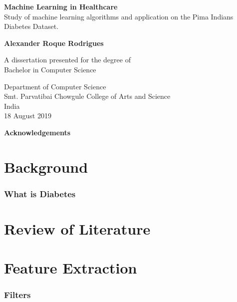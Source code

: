 \documentclass[12pt]{article}
\begin{document}
\begin{titlepage}
    \begin{center}
        \vspace*{1cm} 
        \Huge
        \textbf{Machine Learning in Healthcare} 
        \vspace{0.5cm}
        \normalsize
        \vspace{0cm}
        \\
        Study of machine learning algorithms and application on the Pima Indians Diabetes Dataset.
 
        \vspace{1.5cm}
 
        \textbf{Alexander Roque Rodrigues}
 
        \vfill
 
        A dissertation presented for the degree of\\
        Bachelor in Computer Science
 
        \vspace{0.8cm}
  
        \Large
        Department of Computer Science\\        
        Smt. Parvatibai Chowgule College of Arts and Science\\
        India\\
        18 August 2019
 
    \end{center}
\end{titlepage}
\Huge
\newpage
\huge
\textbf{Acknowledgements}
\normalsize
\newpage
\tableofcontents
\newpage
\part{Background}
\section{What is Diabetes}


\newpage
\part{Review of Literature}
\newpage
\part{Feature Extraction}
\section{Filters}
\end{document}
